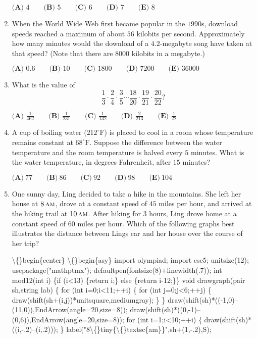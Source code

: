 \documentclass{article}
\begin{document}
\begin{enumerate}[label=\arabic*., itemsep=0.5em]
\(\textbf{(A) } 4 \qquad \textbf{(B) } 5 \qquad \textbf{(C) } 6 \qquad \textbf{(D) } 7 \qquad \textbf{(E) } 8\)\par \vspace{0.5em}\item When the World Wide Web first became popular in the \(1990\)s, download speeds reached a maximum of about \(56\) kilobits per second. Approximately how many minutes would the download of a \(4.2\)-megabyte song have taken at that speed? (Note that there are \(8000\) kilobits in a megabyte.)

\(\textbf{(A) } 0.6 \qquad \textbf{(B) } 10 \qquad \textbf{(C) } 1800 \qquad \textbf{(D) } 7200 \qquad \textbf{(E) } 36000\)\par \vspace{0.5em}\item What is the value of 
\begin{equation*}
\frac{1}{3}\cdot\frac{2}{4}\cdot\frac{3}{5}\cdots\frac{18}{20}\cdot\frac{19}{21}\cdot\frac{20}{22}?
\end{equation*}


\(\textbf{(A) } \frac{1}{462} \qquad \textbf{(B) } \frac{1}{231} \qquad \textbf{(C) } \frac{1}{132} \qquad \textbf{(D) } \frac{2}{213} \qquad \textbf{(E) } \frac{1}{22}\)\par \vspace{0.5em}\item A cup of boiling water (\(212^{\circ}\text{F}\)) is placed to cool in a room whose temperature remains constant at \(68^{\circ}\text{F}\). Suppose the difference between the water temperature and the room temperature is halved every \(5\) minutes. What is the water temperature, in degrees Fahrenheit, after \(15\) minutes?
 
\(\textbf{(A)} ~77\qquad\textbf{(B)} ~86\qquad\textbf{(C)} ~92\qquad\textbf{(D)} ~98\qquad\textbf{(E)} ~104\)\par \vspace{0.5em}\item One sunny day, Ling decided to take a hike in the mountains. She left her house at \(8 \, \textsc{am}\), drove at a constant speed of \(45\) miles per hour, and arrived at the hiking trail at \(10 \, \textsc{am}\). After hiking for \(3\) hours, Ling drove home at a constant speed of \(60\) miles per hour. Which of the following graphs best illustrates the distance between Lings car and her house over the course of her trip?


\textbackslash\{\}begin\{center\}
\textbackslash\{\}begin\{asy\}
import olympiad;
import cse5;
unitsize(12);
usepackage("mathptmx");
defaultpen(fontsize(8)+linewidth(.7));
int mod12(int i) \{if (i<13) \{return i;\} else \{return i-12;\}\}
void drawgraph(pair sh,string lab) \{
for (int i=0;i<11;++i) \{
for (int j=0;j<6;++j) \{
draw(shift(sh+(i,j))*unitsquare,mediumgray);
\}
\}
draw(shift(sh)*((-1,0)--(11,0)),EndArrow(angle=20,size=8));
draw(shift(sh)*((0,-1)--(0,6)),EndArrow(angle=20,size=8));
for (int i=1;i<10;++i) \{
draw(shift(sh)*((i,-.2)--(i,.2)));
\}
label("8\textbackslash\{\}tiny\{\textbackslash\{\}textsc\{am\}\}",sh+(1,-.2),S);
 

\end{enumerate}
\end{document}
